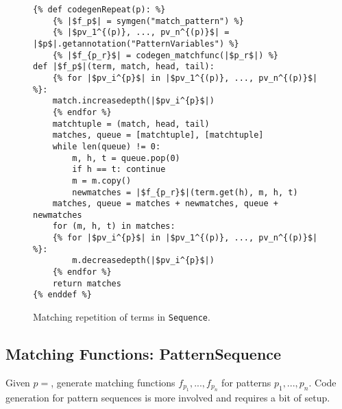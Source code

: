 \begin{figure}[ht]
\begin{verbatim}
{% def codegenRepeat(p): %}
	{% |$f_p$| = symgen("match_pattern") %}
	{% |$pv_1^{(p)}, ..., pv_n^{(p)}$| = |$p$|.getannotation("PatternVariables") %}
	{% |$f_{p_r}$| = codegen_matchfunc(|$p_r$|) %}
def |$f_p$|(term, match, head, tail):
	{% for |$pv_i^{p}$| in |$pv_1^{(p)}, ..., pv_n^{(p)}$| %}:
	match.increasedepth(|$pv_i^{p}$|)
	{% endfor %}
	matchtuple = (match, head, tail)
	matches, queue = [matchtuple], [matchtuple]
	while len(queue) != 0:
		m, h, t = queue.pop(0)
		if h == t: continue
		m = m.copy()
		newmatches = |$f_{p_r}$|(term.get(h), m, h, t)
	matches, queue = matches + newmatches, queue + newmatches
	for (m, h, t) in matches:
	{% for |$pv_i^{p}$| in |$pv_1^{(p)}, ..., pv_n^{(p)}$| %}:
		m.decreasedepth(|$pv_i^{p}$|)
	{% endfor %}
	return matches
{% enddef %}
\end{verbatim}
\caption{Matching repetition of terms \RepeatNoArg \space in \texttt{Sequence}.}
\label{codegen-pattern-ellipsis-1}
\end{figure}


\subsection{Matching Functions: PatternSequence}
Given $p=$\space \PatternSequence, generate matching functions $f_{p_1}, ..., f_{p_n}$ for patterns $p_1, ..., p_n$. Code generation for pattern sequences is more involved and requires a bit of setup.

